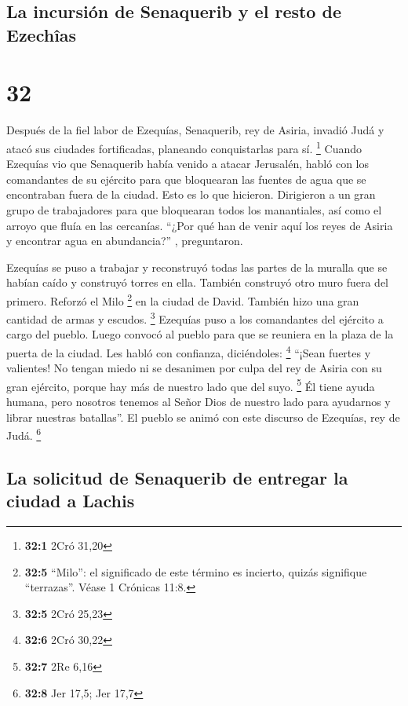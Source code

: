 \hypertarget{la-incursiuxf3n-de-senaquerib-y-el-resto-de-ezechuxeeas}{%
\subsection{La incursión de Senaquerib y el resto de
Ezechîas}\label{la-incursiuxf3n-de-senaquerib-y-el-resto-de-ezechuxeeas}}

\hypertarget{section-31}{%
\section{32}\label{section-31}}

 Después de la fiel labor de Ezequías, Senaquerib, rey de
Asiria, invadió Judá y atacó sus ciudades fortificadas, planeando
conquistarlas para sí. \footnote{\textbf{32:1} 2Cró 31,20}
 Cuando Ezequías vio que Senaquerib había venido a atacar
Jerusalén,  habló con los comandantes de su ejército para
que bloquearan las fuentes de agua que se encontraban fuera de la
ciudad. Esto es lo que hicieron.  Dirigieron a un gran
grupo de trabajadores para que bloquearan todos los manantiales, así
como el arroyo que fluía en las cercanías. ``¿Por qué han de venir aquí
los reyes de Asiria y encontrar agua en abundancia?'' , preguntaron.

 Ezequías se puso a trabajar y reconstruyó todas las
partes de la muralla que se habían caído y construyó torres en ella.
También construyó otro muro fuera del primero. Reforzó el Milo
\footnote{\textbf{32:5} ``Milo'': el significado de este término es
  incierto, quizás signifique ``terrazas''. Véase 1 Crónicas 11:8.} en
la ciudad de David. También hizo una gran cantidad de armas y escudos.
\footnote{\textbf{32:5} 2Cró 25,23}  Ezequías puso a los
comandantes del ejército a cargo del pueblo. Luego convocó al pueblo
para que se reuniera en la plaza de la puerta de la ciudad. Les habló
con confianza, diciéndoles: \footnote{\textbf{32:6} 2Cró 30,22}
 ``¡Sean fuertes y valientes! No tengan miedo ni se
desanimen por culpa del rey de Asiria con su gran ejército, porque hay
más de nuestro lado que del suyo. \footnote{\textbf{32:7} 2Re 6,16}
 Él tiene ayuda humana, pero nosotros tenemos al Señor
Dios de nuestro lado para ayudarnos y librar nuestras batallas''. El
pueblo se animó con este discurso de Ezequías, rey de Judá. \footnote{\textbf{32:8}
  Jer 17,5; Jer 17,7}

\hypertarget{la-solicitud-de-senaquerib-de-entregar-la-ciudad-a-lachis}{%
\subsection{La solicitud de Senaquerib de entregar la ciudad a
Lachis}\label{la-solicitud-de-senaquerib-de-entregar-la-ciudad-a-lachis}}

